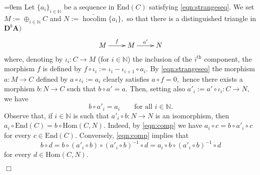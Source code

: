 \documentclass[a4paper,11pt,twoside]{amsart}
\numberwithin{equation}{section}
\theoremstyle{definition}
\renewenvironment{proof}{\par\vspace{-5pt}\par\noindent\begingroup\leftskip=0em\hspace{0em}{\bf Proof.}}{\endgroup\hfill$\Box$}
\begin{document}
\begin{proof}
Let $\{a_i\}_{i\in{\mathbb{N}}}$ be a sequence in ${\mathrm{End}}(C)$ satisfying
\eqref{eqn:strangeseq}. We set $M:=\oplus_{i\in{\mathbb{N}}}C$ and
$N:={\underrightarrow{\operatorname{hocolim}}}\{a_i\},$ so that there is a distinguished triangle in
${\mathbf{D}^{b}}{{\mathbf{{A}}}})$
\begin{equation}\label{eqn:distr}
\xymatrix{
M \ar[r]^-{f} & M \ar[r]^-{a'} & N}
\end{equation}
where, denoting by ${\iota}_i\colon
C\to M$ (for $i\in{\mathbb{N}}$) the inclusion of the $i^{\text{th}}$
component, the morphism $f$ is defined by
$f{\circ}{\iota}_i:={\iota}_i-{\iota}_{i+1}{\circ} a_i.$ By \eqref{eqn:strangeseq} the
morphism $a\colon M\to C$ defined by $a{\circ}{\iota}_i:=a_i$ clearly satisfies
$a{\circ} f=0,$ hence there exists a morphism $b\colon N\to C$ such that $b{\circ} a'=a.$ Then, setting also $a'_i:=a'{\circ}{\iota}_i\colon C\to N,$ we have
\begin{equation}\label{eqn:comp}
b{\circ} a'_i=a_i\qquad\text{for all $i\in{\mathbb{N}}$}.
\end{equation}
Observe that, if $i\in{\mathbb{N}}$ is such that $a'_i{\circ} b\colon N\to N$ is an
isomorphism, then $a_i{\circ} {\mathrm{End}}(C)=b{\circ} {\mathrm{Hom}}(C,N).$ Indeed, by \eqref{eqn:comp}
we have $a_i{\circ} c=b{\circ} a'_i{\circ} c$ for every $c\in{\mathrm{End}}(C).$ Conversely, \eqref{eqn:comp} implies that
\[
b{\circ} d=b{\circ} (a'_i{\circ} b){\circ} (a'_i{\circ} b)^{-1}{\circ} d=a_i{\circ} b{\circ} (a'_i{\circ} b)^{-1}{\circ} d
\]
for every $d\in{\mathrm{Hom}}(C,N).$


\end{proof}
\end{document}
